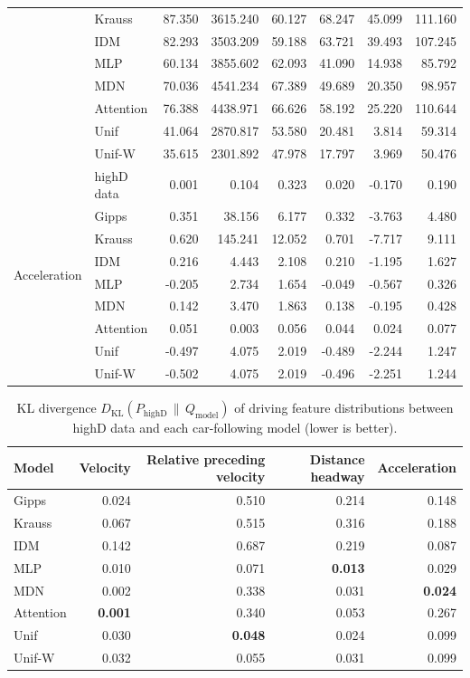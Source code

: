 \documentclass[journal]{IEEEtran}
\begin{document}
\begin{table}[th]
\begin{tabular}{llrrrrrr}
 & Krauss & 87.350 & 3615.240 & 60.127 & 68.247 & 45.099 & 111.160 \\
 & IDM & 82.293 & 3503.209 & 59.188 & 63.721 & 39.493 & 107.245 \\
 & MLP & 60.134 & 3855.602 & 62.093 & 41.090 & 14.938 & 85.792 \\
 & MDN & 70.036 & 4541.234 & 67.389 & 49.689 & 20.350 & 98.957 \\
 & Attention & 76.388 & 4438.971 & 66.626 & 58.192 & 25.220 & 110.644 \\
 & Unif & 41.064 & 2870.817 & 53.580 & 20.481 & 3.814 & 59.314 \\
 & Unif-W & 35.615 & 2301.892 & 47.978 & 17.797 & 3.969 & 50.476 \\
\midrule
\multirow{9}{*}{Acceleration}
 & highD data & 0.001 & 0.104 & 0.323 & 0.020 & -0.170 & 0.190 \\
 & Gipps & 0.351 & 38.156 & 6.177 & 0.332 & -3.763 & 4.480 \\
 & Krauss & 0.620 & 145.241 & 12.052 & 0.701 & -7.717 & 9.111 \\
 & IDM & 0.216 & 4.443 & 2.108 & 0.210 & -1.195 & 1.627 \\
 & MLP & -0.205 & 2.734 & 1.654 & -0.049 & -0.567 & 0.326 \\
 & MDN & 0.142 & 3.470 & 1.863 & 0.138 & -0.195 & 0.428 \\
 & Attention & 0.051 & 0.003 & 0.056 & 0.044 & 0.024 & 0.077 \\
 & Unif & -0.497 & 4.075 & 2.019 & -0.489 & -2.244 & 1.247 \\
 & Unif-W & -0.502 & 4.075 & 2.019 & -0.496 & -2.251 & 1.244 \\
\bottomrule
\end{tabular}
\end{table}

\begin{table}[th]
\centering
\caption{KL divergence $D_{\mathrm{KL}}(P_{\text{highD}} \,\|\, Q_{\text{model}})$ of driving feature distributions between highD data and each car-following model (lower is better).}
\label{tab:highway_models_feature_kl}
\begin{tabular}{lrrrr}
\toprule
Model & Velocity & Relative preceding velocity & Distance headway & Acceleration \\
\midrule
Gipps & 0.024 & 0.510 & 0.214 & 0.148 \\
Krauss & 0.067 & 0.515 & 0.316 & 0.188 \\
IDM & 0.142 & 0.687 & 0.219 & 0.087 \\
MLP & 0.010 & 0.071 & \textbf{0.013} & 0.029 \\
MDN & 0.002 & 0.338 & 0.031 & \textbf{0.024} \\
Attention & \textbf{0.001} & 0.340 & 0.053 & 0.267 \\
Unif & 0.030 & \textbf{0.048} & 0.024 & 0.099 \\
Unif-W & 0.032 & 0.055 & 0.031 & 0.099 \\
\bottomrule
\end{tabular}
\end{table}
\end{document}
